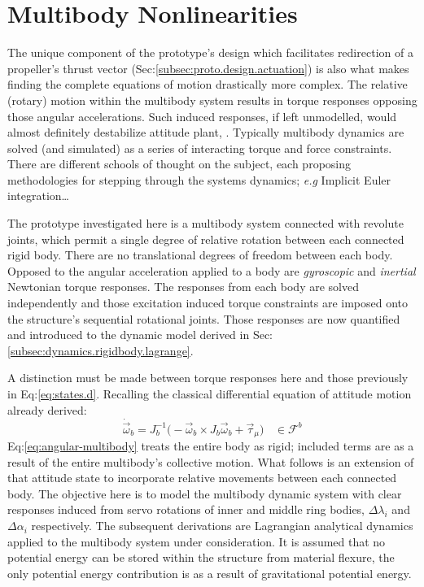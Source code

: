 \section{Multibody Nonlinearities}
\label{sec:dynamics.nonlinearities}
The unique component of the prototype's design which facilitates redirection of a propeller's thrust vector (Sec:\ref{subsec:proto.design.actuation}) is also what makes finding the complete equations of motion drastically more complex. The relative (rotary) motion within the multibody system results in torque responses opposing those angular accelerations. Such induced responses, if left unmodelled, would almost definitely destabilize attitude plant, \cite{inertiaspin}. Typically multibody dynamics are solved (and simulated) as a series of interacting torque and force constraints. There are different schools of thought on the subject, each proposing methodologies for stepping through the systems dynamics; \emph{e.g} Implicit Euler integration\cite{physicallybased,multibodydynamics}\ldots
\par
The prototype investigated here is a multibody system connected with revolute joints, which permit a single degree of relative rotation between each connected rigid body. There are no translational degrees of freedom between each body. Opposed to the angular acceleration applied to a body are \emph{gyroscopic} and \emph{inertial} Newtonian torque responses. The responses from each body are solved independently and those excitation induced torque constraints are imposed onto the structure's sequential rotational joints. Those responses are now quantified and introduced to the dynamic model derived in Sec:\ref{subsec:dynamics.rigidbody.lagrange}. 
\par
A distinction must be made between torque responses here and those previously in Eq:\ref{eq:states.d}. Recalling the classical differential equation of attitude motion already derived:
\begin{equation}\label{eq:angular-multibody}
\dot{\vec{\omega}}_b=J_b^{-1}\big(-\vec{\omega}_b\times J_b\vec{\omega}_b+\vec{\tau}_\mu\big)~~~~\in\mathcal{F}^b
\end{equation}
Eq:\ref{eq:angular-multibody} treats the entire body as rigid; included terms are as a result of the entire multibody's collective motion. What follows is an extension of that attitude state to incorporate relative movements between each connected body. The objective here is to model the multibody dynamic system with clear responses induced from servo rotations of inner and middle ring bodies, $\Delta\lambda_i$ and $\Delta\alpha_i$ respectively. The subsequent derivations are Lagrangian analytical dynamics applied to the multibody system under consideration. It is assumed that no potential energy can be stored within the structure from material flexure, the only potential energy contribution is as a result of gravitational potential energy.
